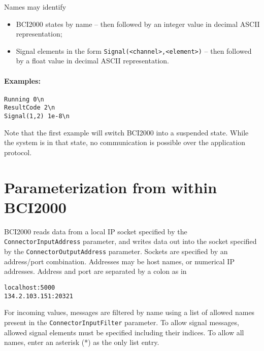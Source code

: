 \documentclass[12pt,letter,notitlepage]{article}
\begin{document}
Names may identify
\begin{itemize}
\item BCI2000 states by name -- then followed
   by an integer value in decimal ASCII representation;
\item Signal elements in the form \texttt{Signal(<channel>,<element>)} --
   then followed by a float value in decimal ASCII representation.
\end{itemize}

\paragraph{Examples:}
\begin{verbatim}
Running 0\n
ResultCode 2\n
Signal(1,2) 1e-8\n
\end{verbatim}

Note that the first example will switch BCI2000 into a suspended state.
While the system is in that state, no communication is possible over the application protocol.

\section{Parameterization from within BCI2000}

BCI2000 reads data from a local IP socket specified by the 
\texttt{ConnectorInputAddress} parameter, and writes data out into the socket specified by the 
\texttt{ConnectorOutputAddress} parameter.
Sockets are specified by an address/port combination.
Addresses may be host names, or numerical IP addresses. Address and port are separated by
a colon as in
\begin{verbatim}
localhost:5000
134.2.103.151:20321
\end{verbatim}

For incoming values, messages are filtered by name using a list of allowed names 
present in the \texttt{ConnectorInputFilter} parameter. 
To allow signal messages, allowed signal elements must be specified including their
indices.
To allow all names, enter an asterisk (*) as the only list entry.
\end{document}
